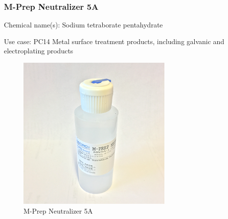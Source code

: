 \subsubsection{M-Prep Neutralizer 5A}
Chemical name(s): Sodium tetraborate pentahydrate 

\vspace{1em}

Use case: PC14 Metal surface treatment products, including galvanic and electroplating products
\begin{figure}[H]
        \centering
        \includegraphics[width=3in]{images/Strain Gauge/M-Prep Neutralizer 5A.png}
        \caption{M-Prep Neutralizer 5A}
        \label{fig:M-Prep Neutralizer 5A}
\end{figure}



